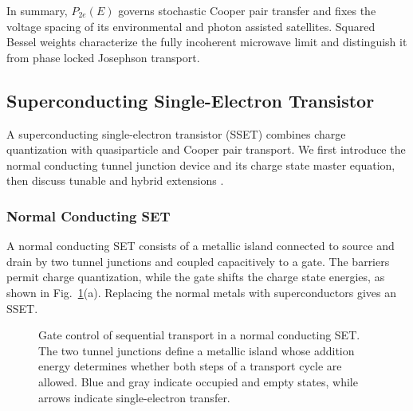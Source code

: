         In summary, $P_{2e}(E)$ governs stochastic Cooper pair transfer and fixes the voltage spacing of its environmental and photon assisted satellites. Squared Bessel weights characterize the fully incoherent microwave limit and distinguish it from phase locked Josephson transport.


    \subsection{Superconducting Single-Electron Transistor}
    \label{subsec:stochastic:sset}

        A superconducting single-electron transistor (SSET) combines charge quantization with quasiparticle and Cooper pair transport. We first introduce the normal conducting tunnel junction device and its charge state master equation, then discuss tunable and hybrid extensions \cite{ingold_charge_1992,grabert_single_2013}.

        \subsubsection*{Normal Conducting SET}

            A normal conducting SET consists of a metallic island connected to source and drain by two tunnel junctions and coupled capacitively to a gate. The barriers permit charge quantization, while the gate shifts the charge state energies, as shown in Fig.~\ref{fig:stochastic:set}(a). Replacing the normal metals with superconductors gives an SSET.

            \begin{figure}[t]
                \centering
                \hfill
                \hfill
                \caption{
                    Gate control of sequential transport in a normal conducting SET. The two tunnel junctions define a metallic island whose addition energy determines whether both steps of a transport cycle are allowed. Blue and gray indicate occupied and empty states, while arrows indicate single-electron transfer.
                    }
                \label{fig:stochastic:set}
            \end{figure}

